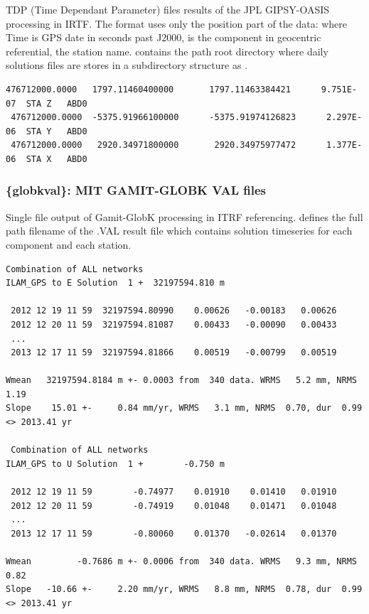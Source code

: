 TDP (Time Dependant Parameter) files results of the JPL GIPSY-OASIS processing in IRTF. The format uses only the position part of the data:  where Time is GPS date in seconds past J2000,  is the component in geocentric referential,  the station name.  contains the path root directory where daily solutions files are stores in a subdirectory structure as .

\begin{lstlisting}[language={},title=GIPSY-OASIS TDP format example]
 476712000.0000   1797.11460400000       1797.11463384421      9.751E-07  STA Z   ABD0
 476712000.0000  -5375.91966100000      -5375.91974126823      2.297E-06  STA Y   ABD0
 476712000.0000   2920.34971800000       2920.34975977472      1.377E-06  STA X   ABD0
\end{lstlisting}


\subsubsection{\{globkval\}: MIT GAMIT-GLOBK VAL files}

Single file output of Gamit-GlobK processing in ITRF referencing.  defines the full path filename of the .VAL result file which contains solution timeseries for each component and each station.

\begin{lstlisting}[language={},title=GAMIT-GLOBK VAL format example]
 Combination of ALL networks
ILAM_GPS to E Solution  1 +  32197594.810 m

 2012 12 19 11 59  32197594.80990    0.00626   -0.00183   0.00626
 2012 12 20 11 59  32197594.81087    0.00433   -0.00090   0.00433
 ...
 2013 12 17 11 59  32197594.81866    0.00519   -0.00799   0.00519

Wmean   32197594.8184 m +- 0.0003 from  340 data. WRMS   5.2 mm, NRMS  1.19
Slope    15.01 +-     0.84 mm/yr, WRMS   3.1 mm, NRMS  0.70, dur  0.99 <> 2013.41 yr

 Combination of ALL networks
ILAM_GPS to U Solution  1 +        -0.750 m

 2012 12 19 11 59        -0.74977    0.01910    0.01410   0.01910
 2012 12 20 11 59        -0.74919    0.01048    0.01471   0.01048
 ...
 2013 12 17 11 59        -0.80060    0.01370   -0.02614   0.01370

Wmean         -0.7686 m +- 0.0006 from  340 data. WRMS   9.3 mm, NRMS  0.82
Slope   -10.66 +-     2.20 mm/yr, WRMS   8.8 mm, NRMS  0.78, dur  0.99 <> 2013.41 yr
\end{lstlisting}



